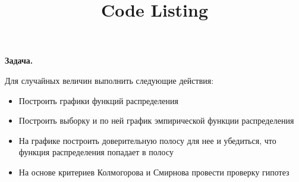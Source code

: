 \documentclass{article}
\title{Code Listing}
\begin{document}
	{\bf Задача.}
	
	Для случайных величин выполнить следующие действия:
	\begin{itemize}
		\item Построить графики функций распределения
		\item Построить выборку и по ней график эмпирической функции распределения
		\item На  графике построить доверительную полосу для нее и  убедиться, что функция распределения попадает в полосу
		\item На основе критериев Колмогорова и Смирнова провести проверку гипотез
	\end{itemize}
\end{document}
